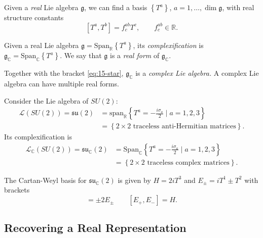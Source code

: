 Given a \emph{real} Lie algebra $\mathfrak{g}$, we can find a basis $\left\{ T^{a} \right\}$, $a = 1, \dots, \dim \mathfrak{g}$, with real structure constants
\begin{equation}
  \label{eq:15-star}
  [T^{a}, T^{b}] = f^{ab}_{c} T^{c}, \qquad f^{ab}_{c} \in \mathbb{R}.
\end{equation}
\begin{definition}[]
  Given a real Lie algebra $\mathfrak{g} = \text{Span}_{\mathbb{R}} \left\{ T^{a} \right\}$, its \emph{complexification} is $\mathfrak{g}_{\mathbb{C}} = \text{Span}_{\mathbb{C}} \left\{ T^{a} \right\}$.
  We say that $\mathfrak{g}$ is a \emph{real form} of $\mathfrak{g}_\mathbb{C}$.
\end{definition}
Together with the bracket \eqref{eq:15-star}, $\mathfrak{g}_{\mathbb{C}}$ is a \emph{complex Lie algebra.}
A complex Lie algebra can have multiple real forms.
\begin{example}[]
  Consider the Lie algebra of $SU(2)$:
  \begin{align}
    \mathscr{L}(SU(2)) = \mathfrak{su}(2) &= \text{span}_{\mathbb{R}} \left\{ T^{a} = -\frac{i\sigma_{a}}{2} \mid a = 1,2,3 \right\} \\
		     &= \left\{ 2 \times 2 \text{ traceless anti-Hermitian matrices} \right\}.
  \end{align}
  Its complexification is
  \begin{align}
    \mathscr{L}_{\mathbb{C}}(SU(2)) = \mathfrak{su}_{\mathbb{C}}(2) &= \text{Span}_{\mathbb{C}}\left\{T^{a} = -\frac{i\sigma_{a}}{2} \mid a = 1,2,3\right\} \\
    &= \left\{ 2 \times 2 \text{ traceless complex matrices} \right\}.
  \end{align}
\end{example}

The Cartan-Weyl basis for $\mathfrak{su}_{\mathbb{C}}(2)$ is given by $H = 2 i T^3$ and $E_\pm = i T^1 \pm T^2$ with brackets
\begin{equation}
  [H, E_\pm] = \pm 2 E_{\pm} \qquad [E_+, E_-] = H.
\end{equation}

\subsection*{Recovering a Real Representation}%

